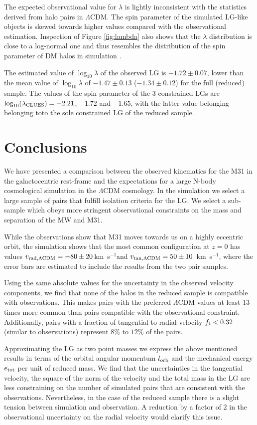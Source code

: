 \documentclass{emulateapj}
\newcommand{\kms}{\,km~s$^{-1}$}
\begin{document}
The expected observational value for $\lambda$ is lightly inconsistent with
the statistics derived from halo pairs in $\Lambda$CDM. The spin
parameter of the simulated LG-like objects is skewed towards higher
values compared with the observational estimation.  Inspection
of Figure \ref{fig:lambda} also shows that the $\lambda$ distribution is
close to a log-normal one and thus resembles the distribution of the
spin parameter of DM halos in simulation \citep{Bett2007}.  

The estimated value of $\log_{10}\lambda$ of the
observed LG is $-1.72\pm 0.07$, lower than the mean value of
$\log_{10}\lambda$ of $-1.47\pm0.13$ ($-1.34\pm 0.12$) for the full
(reduced) sample. The values of the spin parameter of the 3
constrained LGs are $\log_{10}(\lambda_{\rm  CLUES})=-2.21$, $-1.72$
and $-1.65$, with the latter value belonging belonging toto the sole
constrained LG of the reduced sample.

\section{Conclusions}
We have presented a comparison between the observed kinematics for the
M31 in the galactocentric rest-frame and the expectations for a large
N-body cosmological simulation in the $\Lambda$CDM cosmology. In the
simulation we select a large sample of pairs that fulfill isolation
criteria for the LG. We select a sub-sample which obeys more
stringent observational constraints on the mass and separation of the
MW and M31.

While the observations show that M31 moves towards us  on a highly eccentric orbit,
 the simulation shows that the most common configuration at $z=0$ has
 values $v_{\rm rad, \Lambda CDM}=-80\pm20$\kms and $v_{\rm tan,
   \Lambda CDM}=50\pm10$ \kms, where the error bars are estimated to
 include the results from the two pair samples.


Using the same absolute values for the uncertainty in the observed
velocity components, we find that none of the halos in the reduced sample
is compatible with observations. This makes pairs with the preferred
$\Lambda$CDM values at least $13$ times more common than pairs
compatible with the observational constraint. Additionally, pairs with
a fraction of tangential to radial velocity $f_{\rm t}<0.32$ (similar
to observations) represent $8\%$ to $12\%$ of the pairs.
 

Approximating the LG as two point masses we express the above
mentioned results in terms of the orbital angular momentum $l_{\rm
  orb}$ and the mechanical energy $e_{\rm tot}$ per unit of reduced
mass. We find that the uncertainties in the tangential velocity, the
square of the norm of the velocity and the total mass in the LG
are less constraining on the number of simulated pairs that are
consistent with the observations. Nevertheless, in the case of the
reduced sample there is a slight tension between simulation and
observation. A reduction by a factor of $2$ in the observational
uncertainty on the radial velocity would clarify this issue. 
\end{document}
